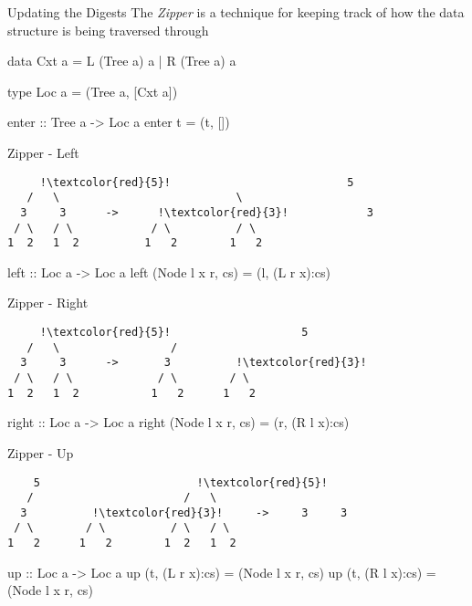 \begin{slide}{Updating the Digests}
The \textit{Zipper} is a technique for keeping track of how the data structure is being traversed through

\begin{haskell}
data Cxt a = L (Tree a) a | R (Tree a) a

type Loc a = (Tree a, [Cxt a])

enter :: Tree a -> Loc a
enter t = (t, [])
\end{haskell}
\end{slide}

\begin{slide}{Zipper - Left}
\begin{center}
\begin{verbatim}
     !\textcolor{red}{5}!                           5     
   /   \                           \    
  3     3      ->      !\textcolor{red}{3}!            3    
 / \   / \            / \          / \  
1  2   1  2          1   2        1   2 
\end{verbatim}

\vspace*{0.4cm}
\begin{haskell}
left :: Loc a -> Loc a
left (Node l x r, cs) = (l, (L r x):cs)
\end{haskell}
\end{center}
\end{slide}

\begin{slide}{Zipper - Right}
\begin{center}
\begin{verbatim}
     !\textcolor{red}{5}!                    5     
   /   \                 /           
  3     3      ->       3          !\textcolor{red}{3}!  
 / \   / \             / \        / \ 
1  2   1  2           1   2      1   2
\end{verbatim}

\vspace*{0.4cm}
\begin{haskell}
right :: Loc a -> Loc a
right (Node l x r, cs) = (r, (R l x):cs)
\end{haskell}
\end{center}
\end{slide}

\begin{slide}{Zipper - Up}
\begin{center}
\begin{verbatim}
    5                        !\textcolor{red}{5}!        
   /                       /   \           
  3          !\textcolor{red}{3}!     ->     3     3      
 / \        / \          / \   / \     
1   2      1   2        1  2   1  2   
\end{verbatim}

\vspace*{0.4cm}
\begin{haskell}
up :: Loc a -> Loc a
up (t, (L r x):cs) = (Node l x r, cs)
up (t, (R l x):cs) = (Node l x r, cs)
\end{haskell}
\end{center}
\end{slide}

